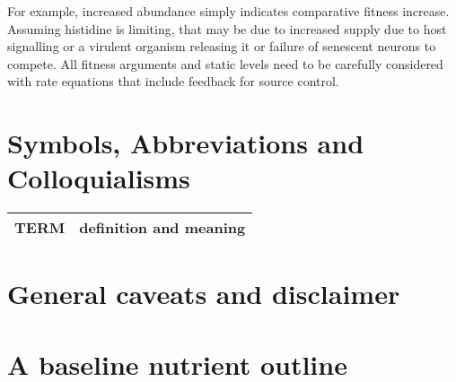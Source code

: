 \documentclass[aps,secnumarabic,balancelastpage,amsmath,amssymb,nofootinbib]{revtex4}
\begin{document}
For example, increased abundance simply indicates comparative fitness
increase. Assuming histidine is limiting, that may be due to
increased supply due to host signalling or a virulent
organism releasing it or failure of senescent neurons to 
compete. All fitness arguments and static levels need to
be carefully considered with rate equations that include
feedback for source control.  



\section{Symbols, Abbreviations and Colloquialisms}

\begin{comment}
\end{comment}


\noindent
\begin{tabular}{@{}ll}
TERM & definition and meaning   \\
\hline
\end{tabular} %


\section{General caveats and disclaimer }
\label{appendix:caveats}

%



\section{ A baseline nutrient outline  }
\label{appendix:baseline}
%
\end{document}
